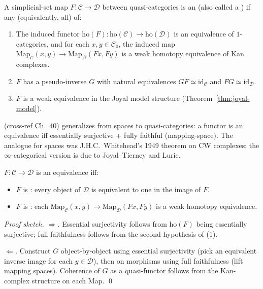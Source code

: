 \begin{definition}
\label{def:equiv-qcat}
A simplicial-set map $F : \mathcal{C} \to \mathcal{D}$ between
quasi-categories is an  (also called a ) if any (equivalently, all) of:
\begin{enumerate}
  \item The induced functor $\mathrm{ho}(F) : \mathrm{ho}(\mathcal{C}) \to
        \mathrm{ho}(\mathcal{D})$ is an equivalence of $1$-categories, and
        for each $x, y \in \mathcal{C}_0$, the induced map
        $\mathrm{Map}_\mathcal{C}(x, y) \to \mathrm{Map}_\mathcal{D}(Fx, Fy)$
        is a weak homotopy equivalence of Kan complexes.
  \item $F$ has a pseudo-inverse $G$ with natural equivalences
        $GF \simeq \mathrm{id}_\mathcal{C}$ and $FG \simeq \mathrm{id}_\mathcal{D}$.
  \item $F$ is a weak equivalence in the Joyal model structure
        (Theorem~\ref{thm:joyal-model}).
\end{enumerate}
\end{definition}

\begin{nameorigin}
 (cross-ref Ch.~40) generalizes from spaces
to quasi-categories: a functor is an equivalence iff essentially
surjective + fully faithful (mapping-space). The analogue for spaces
was J.H.C.\ Whitehead's 1949 theorem on CW complexes; the
$\infty$-categorical version is due to Joyal--Tierney and Lurie.
\end{nameorigin}

\begin{theorem}
\label{thm:whitehead-qcat}
$F : \mathcal{C} \to \mathcal{D}$ is an equivalence iff:
\begin{itemize}
  \item $F$ is : every object of $\mathcal{D}$
        is equivalent to one in the image of $F$.
  \item $F$ is : each
        $\mathrm{Map}_\mathcal{C}(x, y) \to \mathrm{Map}_\mathcal{D}(Fx, Fy)$
        is a weak homotopy equivalence.
\end{itemize}
\end{theorem}

\begin{proof}[Proof sketch]
\emph{$\Rightarrow$.} Essential surjectivity follows from
$\mathrm{ho}(F)$ being essentially surjective; full faithfulness follows
from the second hypothesis of (1).

\emph{$\Leftarrow$.} Construct $G$ object-by-object using essential
surjectivity (pick an equivalent inverse image for each $y \in
\mathcal{D}$), then on morphisms using full faithfulness (lift mapping
spaces). Coherence of $G$ as a quasi-functor follows from the Kan-complex
structure on each $\mathrm{Map}$. \qed
\end{proof}


